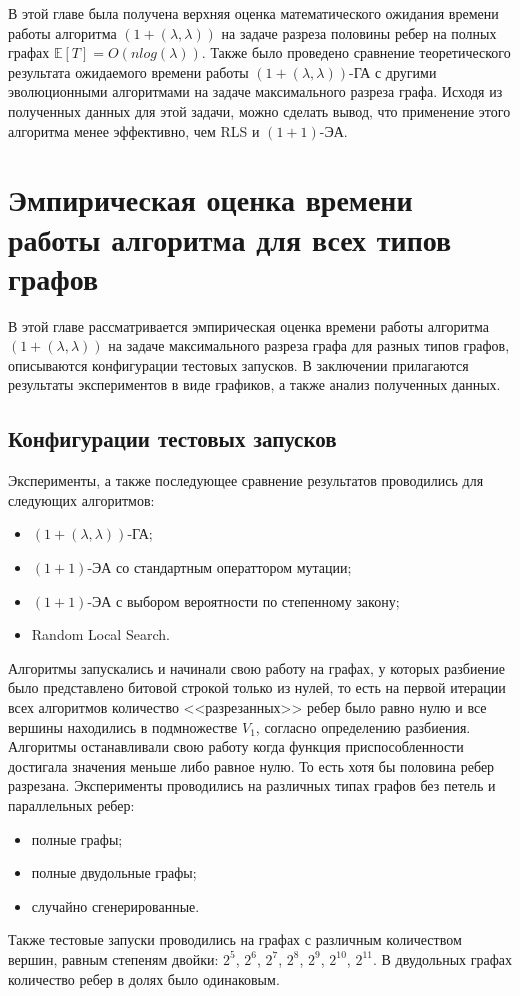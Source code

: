 \documentclass[times]{itmo-student-thesis}
\newcommand{\alglambda}{${(1 + (\lambda , \lambda))}$\xspace}
\newcommand{\alglambdaf}{${(1 + (\lambda , \lambda))}$-ГА\xspace}
\newcommand{\oea}{\mbox{$(1 + 1)$-ЭА}\xspace}
\begin{document}
В этой главе была получена верхняя оценка математического ожидания времени работы алгоритма \alglambda на задаче разреза половины ребер на полных графах $\mathbb{E}[T]=O(nlog(\lambda))$. Также было проведено сравнение теоретического результата ожидаемого времени работы \alglambdaf с другими эволюционными алгоритмами на задаче максимального разреза графа. Исходя из полученных данных для этой задачи, можно сделать вывод, что применение этого алгоритма менее эффективно, чем RLS и \oea.
\chapter{Эмпирическая оценка времени работы алгоритма для всех типов графов}
В этой главе рассматривается эмпирическая оценка времени работы алгоритма \alglambda на задаче максимального разреза графа для разных типов графов, описываются конфигурации тестовых запусков. В заключении прилагаются результаты экспериментов в виде графиков, а также анализ полученных данных.

\section{Конфигурации тестовых запусков}
Эксперименты, а также последующее сравнение результатов проводились для следующих алгоритмов:
\begin{itemize}
 \item \alglambdaf;
 \item \oea со стандартным операттором мутации;
 \item \oea с выбором вероятности по степенному закону;
 \item Random Local Search.
\end{itemize}
Алгоритмы запускались и начинали свою работу на графах, у которых разбиение было представлено битовой строкой только из нулей, то есть на первой итерации всех алгоритмов количество <<разрезанных>> ребер было равно нулю и все вершины находились в подмножестве $V_1$, согласно определению разбиения. Алгоритмы останавливали свою работу когда функция приспособленности достигала значения меньше либо равное нулю. То есть хотя бы половина ребер разрезана.
Эксперименты проводились на различных типах графов без петель и параллельных ребер:
\begin{itemize}
 \item полные графы;
 \item полные двудольные графы;
 \item случайно сгенерированные.
\end{itemize}
Также тестовые запуски проводились на графах с различным количеством вершин, равным степеням двойки: $2^5$, $2^6$, $2^7$, $2^8$, $2^9$, $2^{10}$, $2^{11}$.
В двудольных графах количество ребер в долях было одинаковым.
\end{document}
